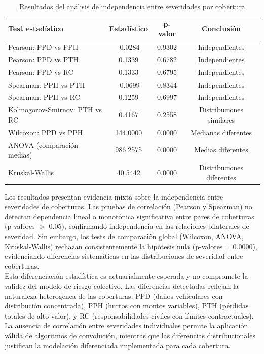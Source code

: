 \begin{table}[H]
\centering
\caption{Resultados del análisis de independencia entre severidades por cobertura}
\begin{tabular}{lccc}
\hline
\textbf{Test estadístico} & \textbf{Estadístico} & \textbf{p-valor} & \textbf{Conclusión} \\
\hline
Pearson: PPD vs PPH & -0.0284 & 0.9302 & Independientes \\
Pearson: PPD vs PTH & 0.1339 & 0.6782 & Independientes \\
Pearson: PPD vs RC & 0.1333 & 0.6795 & Independientes \\
Spearman: PPH vs PTH & -0.0699 & 0.8344 & Independientes \\
Spearman: PPH vs RC & 0.1259 & 0.6997 & Independientes \\
Kolmogorov-Smirnov: PTH vs RC & 0.4167 & 0.2558 & Distribuciones similares \\
Wilcoxon: PPD vs PPH & 144.0000 & 0.0000 & Medianas diferentes \\
ANOVA (comparación medias) & 986.2575 & 0.0000 & Medias diferentes \\
Kruskal-Wallis & 40.5442 & 0.0000 & Distribuciones diferentes \\
\hline
\end{tabular}
\end{table}

Los resultados presentan evidencia mixta sobre la independencia entre severidades de coberturas. Las pruebas de correlación (Pearson y Spearman) no detectan dependencia lineal o monotónica significativa entre pares de coberturas (p-valores $>$ 0.05), confirmando independencia en las relaciones bilaterales de severidad. Sin embargo, los tests de comparación global (Wilcoxon, ANOVA, Kruskal-Wallis) rechazan consistentemente la hipótesis nula (p-valores = 0.0000), evidenciando diferencias sistemáticas en las distribuciones de severidad entre coberturas.\\

Esta diferenciación estadística es actuarialmente esperada y no compromete la validez del modelo de riesgo colectivo. Las diferencias detectadas reflejan la naturaleza heterogénea de las coberturas: PPD (daños vehiculares con distribución concentrada), PPH (hurtos con montos variables), PTH (pérdidas totales de alto valor), y RC (responsabilidades civiles con límites contractuales). La ausencia de correlación entre severidades individuales permite la aplicación válida de algoritmos de convolución, mientras que las diferencias distribucionales justifican la modelación diferenciada implementada para cada cobertura.

